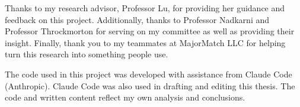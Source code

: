 

Thanks to my research advisor, Professor Lu, for providing her guidance and feedback on this project. Additionally, thanks to Professor Nadkarni and Professor Throckmorton for serving on my committee as well as providing their insight. Finally, thank you to my teammates at MajorMatch LLC for helping turn this research into something people use.

The code used in this project was developed with assistance from Claude Code (Anthropic). Claude Code was also used in drafting and editing this thesis. The code and written content reflect my own analysis and conclusions.    